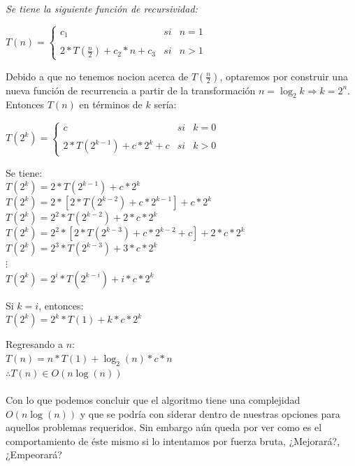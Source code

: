 \documentclass[12pt,twoside]{article}
\begin{document}
\centerline{}
\centerline{\textit{Se tiene la siguiente función de recursividad:}}
\begin{center}
  $T(n) =\left\{ \begin{array}{lcc}
      c_{1} &   si& n=1\\
  \\  2*T(\frac{n}{2}) + c_{2}*n + c_{3} &  si  & n>1 
  \end{array}
  \right.
  $
\end{center}

Debido a que no tenemos nocion acerca de $T(\frac{n}{2})$, optaremos por construir una nueva función de recurrencia a partir 
de la transformación $n = \log_{2} k \Rightarrow k = 2^n$. Entonces $T(n)$ en términos de $k$ sería:

\begin{center}
  $T(2^k) =\left\{ \begin{array}{lcc}
      c &   si& k=0\\
  \\  2*T(2^{k-1}) + c*2^k + c &  si  & k>0 
  \end{array}
  \right.
  $
\end{center}
\newpage

Se tiene:\\

  $T(2^k)=2*T(2^{k-1}) + c*2^k$\\
  $T(2^k)=2*[2*T(2^{k-2}) + c*2^{k-1}] + c*2^k$\\
  $T(2^k)=2^2*T(2^{k-2}) + 2*c*2^k$\\
  $T(2^k)=2^2*[2*T(2^{k-3}) + c*2^{k-2} + c] + 2*c*2^k$\\
  $T(2^k)=2^3*T(2^{k-3}) + 3*c*2^k$\\
  $\vdots$\\
  $T(2^k)=2^i*T(2^{k-i}) + i*c*2^k$\\ 
  \centerline{}
  Si $k = i$, entonces:\\
  $T(2^k)=2^k*T(1) + k*c*2^k$\\ 
  \centerline{}
  Regresando a $n$:\\
  $T(n)=n*T(1) + \log_{2}(n)*c*n$\\
  $\therefore T(n) \in O(n \log(n))$\\ \\

Con lo que podemos concluir que el algoritmo tiene una complejidad $O(n\log(n))$ y que se podría con siderar dentro de nuestras
opciones para aquellos problemas requeridos. Sin embargo aún queda por ver como es el comportamiento de éste mismo si lo intentamos
por fuerza bruta, ¿Mejorará?, ¿Empeorará?
\end{document}
